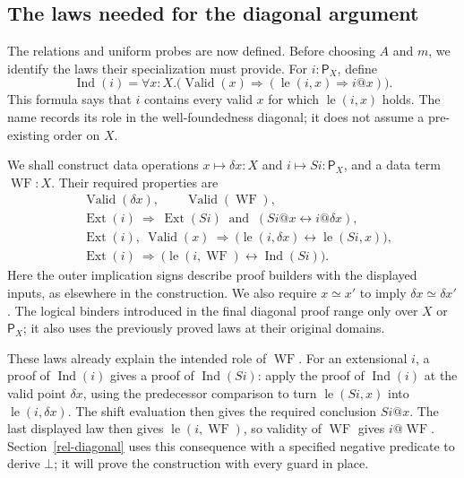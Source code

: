 \subsection{The laws needed for the diagonal argument}
\label{rel-target-laws}

The relations and uniform probes are now defined.  Before choosing
$A$ and $m$, we identify the laws their specialization must provide.
For $i:\mathsf P_X$, define
\begin{equation}
 \operatorname{Ind}(i)=
 \forall x:X.\bigl(\operatorname{Valid}(x)\Rightarrow
       (\operatorname{le}(i,x)\Rightarrow i@x)\bigr).
 \label{rel-ind-definition}
\end{equation}
This formula says that $i$ contains every valid $x$ for which
$\operatorname{le}(i,x)$ holds.  The name records its role in the
well-foundedness diagonal; it does not assume a pre-existing order on $X$.

We shall construct data operations $x\mapsto\delta x:X$ and
$i\mapsto Si:\mathsf P_X$, and a data term
$\operatorname{WF}:X$.  Their required properties are
\begin{align*}
 &\operatorname{Valid}(\delta x),\qquad
                    \operatorname{Valid}(\operatorname{WF}),\\
 &\operatorname{Ext}(i)\ \Longrightarrow\
     \operatorname{Ext}(Si)\ \text{ and }\
                  (Si@x\leftrightarrow i@\delta x),\\
 &\operatorname{Ext}(i),\ \operatorname{Valid}(x)
       \ \Longrightarrow\
       \bigl(\operatorname{le}(i,\delta x)
                      \leftrightarrow\operatorname{le}(Si,x)\bigr),\\
 &\operatorname{Ext}(i)\ \Longrightarrow\
       \bigl(\operatorname{le}(i,\operatorname{WF})
                              \leftrightarrow\operatorname{Ind}(Si)\bigr).
\end{align*}
Here the outer implication signs describe proof builders with the
displayed inputs, as elsewhere in the construction.  We also require
$x\simeq x'$ to imply $\delta x\simeq\delta x'$.
The logical binders introduced in the final diagonal proof range only
over $X$ or $\mathsf P_X$; it also uses the previously proved laws at
their original domains.

These laws already explain the intended role of $\operatorname{WF}$.
For an extensional $i$, a proof of $\operatorname{Ind}(i)$ gives a
proof of $\operatorname{Ind}(Si)$: apply the proof of
$\operatorname{Ind}(i)$ at
the valid point $\delta x$, using the predecessor comparison to turn
$\operatorname{le}(Si,x)$ into $\operatorname{le}(i,\delta x)$.
The shift evaluation then gives the required conclusion $Si@x$.
The last displayed law then gives
$\operatorname{le}(i,\operatorname{WF})$, so validity of
$\operatorname{WF}$ gives $i@\operatorname{WF}$.  Section~\ref{rel-diagonal}
uses this consequence with a specified negative predicate to derive
$\bot$; it will prove the construction with every guard in place.

